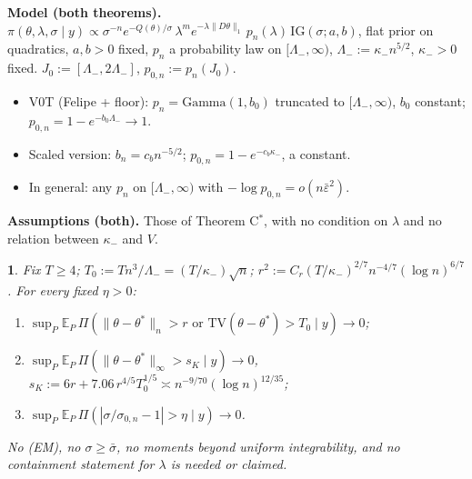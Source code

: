 \documentclass[11pt]{article}
\newcommand{\E}{\mathbb{E}}
\newcommand{\norm}[1]{\lVert #1\rVert}
\newcommand{\TV}{\mathrm{TV}}
\newcommand{\sbar}{\bar\sigma}
\newcommand{\szero}{\sigma_{0,n}}
\newcommand{\IG}{\mathrm{IG}}
\newcommand{\Ga}{\mathrm{Gamma}}
\newcommand{\supP}{\sup_{P}\E_P\,}
\theoremstyle{plain}
\newcommand{\mythmname}{}
\newtheorem*{namedx}{\mythmname}
\newenvironment{named}[1]{\renewcommand{\mythmname}{#1}\begin{namedx}}{\end{namedx}}
\begin{document}
\noindent\textbf{Model (both theorems).} $\pi(\theta,\lambda,\sigma\mid y)\propto\sigma^{-n}e^{-Q(\theta)/\sigma}\,\lambda^me^{-\lambda\norm{D\theta}_1}\,p_n(\lambda)\,\IG(\sigma;a,b)$, flat prior on quadratics, $a,b>0$ fixed, $p_n$ a probability law on $[\Lambda_-,\infty)$, $\Lambda_-:=\kappa_-n^{5/2}$, $\kappa_->0$ fixed. $J_0:=[\Lambda_-,2\Lambda_-]$, $p_{0,n}:=p_n(J_0)$.
\begin{itemize}
\item V0T (Felipe + floor): $p_n=\Ga(1,b_0)$ truncated to $[\Lambda_-,\infty)$, $b_0$ constant; $p_{0,n}=1-e^{-b_0\Lambda_-}\to1$.
\item Scaled version: $b_n=c_bn^{-5/2}$; $p_{0,n}=1-e^{-c_b\kappa_-}$, a constant.
\item In general: any $p_n$ on $[\Lambda_-,\infty)$ with $-\log p_{0,n}=o(n\bar\varepsilon^2)$.
\end{itemize}
\textbf{Assumptions (both).} Those of Theorem C$^*$, with no condition on $\lambda$ and no relation between $\kappa_-$ and $V$.

\begin{named}{Theorem V0T}
Fix $T\ge4$; $T_0:=Tn^3/\Lambda_-=(T/\kappa_-)\sqrt n$; $r^2:=C_r(T/\kappa_-)^{2/7}n^{-4/7}(\log n)^{6/7}$. For every fixed $\eta>0$:
\begin{enumerate}[label=\arabic*.]
\item $\supP\Pi(\norm{\theta-\theta^*}_n>r\text{ or }\TV(\theta-\theta^*)>T_0\mid y)\to0$;
\item $\supP\Pi(\norm{\theta-\theta^*}_\infty>s_K\mid y)\to0$, $s_K:=6r+7.06\,r^{4/5}T_0^{1/5}\asymp n^{-9/70}(\log n)^{12/35}$;
\item $\supP\Pi(|\sigma/\szero-1|>\eta\mid y)\to0$.
\end{enumerate}
No (EM), no $\sigma\ge\sbar$, no moments beyond uniform integrability, and no containment statement for $\lambda$ is needed or claimed.
\end{named}
\end{document}

